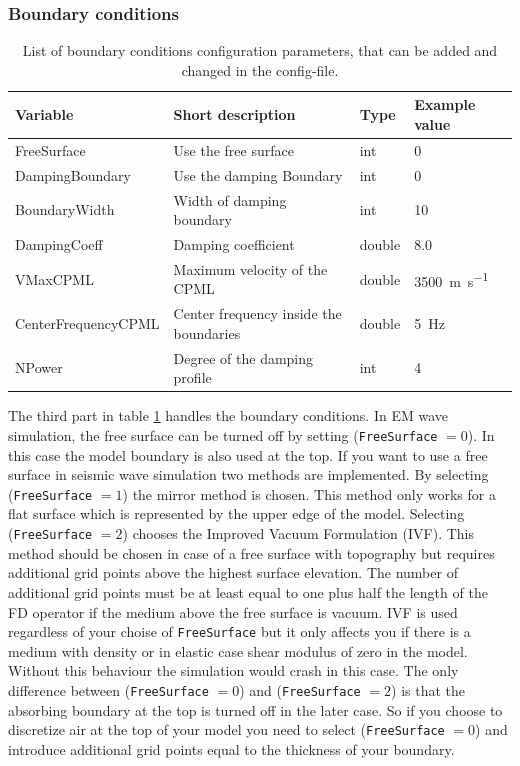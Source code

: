 \documentclass[pdftex,a4paper,parskip,listof=totoc,bibliography=totoc,onehalfspacing,12pt]{scrreprt}
\begin{document}
\subsubsection{Boundary conditions}
\begin{table}[h!]
\caption[List of boundary conditions configuration parameters.]{List of boundary conditions configuration parameters, that can be added and changed in the config-file.}\label{tab:config_boundary}
\centering
\begin{adjustbox}{width=1\textwidth,center=\textwidth}
	\begin{tabular}{llll}
	\toprule
	Variable & Short description & Type & Example value \\
	\midrule
	FreeSurface& Use the free surface & int & \num{0}\\
	DampingBoundary& Use the damping Boundary & int & \num{0}\\
	BoundaryWidth& Width of damping boundary & int & \num{10}\\
	DampingCoeff& Damping coefficient & double & \num{8.0}\\
	VMaxCPML& Maximum velocity of the CPML & double &\SI{3500}{m\per s}\\
	CenterFrequencyCPML\;\;\;\;& Center frequency inside the boundaries\;\;\;  & double &\SI{5}{Hz}\\
	NPower& Degree of the damping profile & int &\num{4}\\
	\bottomrule
	\end{tabular}
	\end{adjustbox}
\end{table}
The third part in table \ref{tab:config_boundary} handles the boundary conditions. In EM wave simulation, the free surface can be turned off by setting (\verb+FreeSurface+ $=0$). In this case the model boundary is also used at the top. If you want to use a free surface in seismic wave simulation two methods are implemented. By selecting (\verb+FreeSurface+ $=1$) the mirror method is chosen. This method only works for a flat surface which is represented by the upper edge of the model. Selecting (\verb+FreeSurface+ $=2$) chooses the Improved Vacuum Formulation (IVF). This method should be chosen in case of a free surface with topography but requires additional grid points above the highest surface elevation. The number of additional grid points must be at least equal to one plus half the length of the FD operator if the medium above the free surface is vacuum. IVF is used regardless of your choise of \verb+FreeSurface+ but it only affects you if there is a medium with density or in elastic case shear modulus of zero in the model. Without this behaviour the simulation would crash in this case. The only difference between (\verb+FreeSurface+ $=0$) and (\verb+FreeSurface+ $=2$) is that the absorbing boundary at the top is turned off in the later case. So if you choose to discretize air at the top of your model you need to select (\verb+FreeSurface+ $=0$) and introduce additional grid points equal to the thickness of your boundary. 
\end{document}
